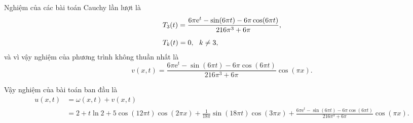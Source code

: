 \documentclass[10pt, a4paper]{article}
\begin{document}
	Nghiệm của các bài toán Cauchy lần lượt là \begin{align*}
		&T_3(t)=\frac{6\pi\mathrm e^t-\sin(6\pi t)-6\pi\cos(6\pi t)}{216\pi^3+6\pi},\\
		\noalign{\vskip5pt}
		&T_k(t)=0,~~k\ne3,
	\end{align*}
	và vì vậy nghiệm của phương trình không thuần nhất là $$v(x,t)=\frac{6\pi\mathrm e^t-\sin(6\pi t)-6\pi\cos(6\pi t)}{216\pi^3+6\pi}\cos(\pi x).$$
	
	Vậy nghiệm của bài toán ban đầu là \begin{align*}
		u(x,t)&=\omega(x,t)+v(x,t)\\
		&=2+t\ln2+5\cos(12\pi t)\cos(2\pi x)+\frac{1}{18\pi}\sin(18\pi t)\cos(3\pi x)+\frac{6\pi\mathrm e^t-\sin(6\pi t)-6\pi\cos(6\pi t)}{216\pi^3+6\pi}\cos(\pi x).
	\end{align*}
\end{document}
